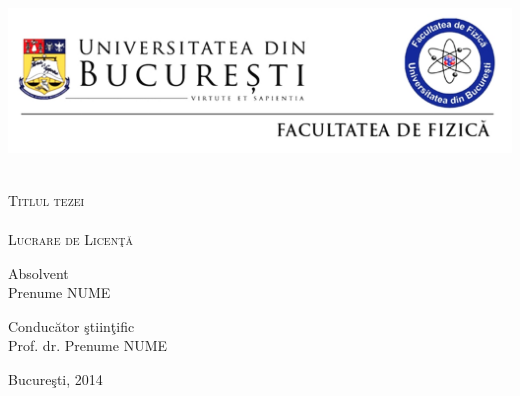 \begin{titlepage}
\begin{center}





\includegraphics[width=16cm]{./antet_L.jpg}



\vspace{4cm}



    \HRule \\[0.3cm]


    {\Large \textsc {Titlul tezei}}\\


  \HRule \\[1.1cm]

  \textsc{\large Lucrare de Licen\c{t}\u{a}}\\[4cm]

   \begin{flushleft} \large
    {Absolvent} \\[0.1cm]
    Prenume NUME
   \end{flushleft}

   \begin{flushright} \large
    {Conduc\u{a}tor \c{s}tiin\c{t}ific} \\[0.1cm]
    Prof. dr. Prenume NUME
   \end{flushright}


  \vfill


 {\large Bucure\c{s}ti, 2014}

\end{center}

\end{titlepage}
